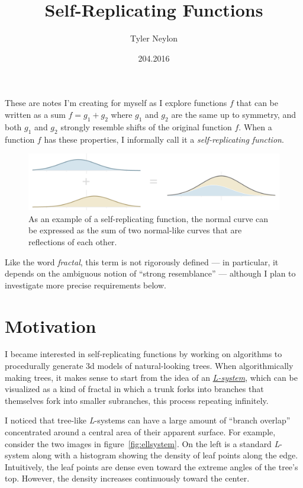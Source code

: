\documentclass[20pt,]{extarticle}
\title{Self-Replicating Functions}
\author{Tyler Neylon}
\date{204.2016}
\newcommand{\class}[1]{}
\newcommand{\optquad}{\quad}
\begin{document}
\maketitle

\newcommand{\R}{\mathbb{R}}
\newcommand{\eqnset}[1]{\left.\mbox{$#1$}\;\;\right\rbrace\class{postbrace}{ }}
\providecommand{\optquad}{\class{optquad}{}}

These are notes I'm creating for myself as I explore functions \(f\)
that can be written as a sum \(f = g_1 + g_2\) where \(g_1\) and \(g_2\)
are the same up to symmetry, and both \(g_1\) and \(g_2\) strongly
resemble shifts of the original function \(f\). When a function \(f\)
has these properties, I informally call it a \emph{self-replicating
function}.

\begin{figure}
\centering
\includegraphics{images/added_normals4.png}
\caption{As an example of a self-replicating function, the normal curve
can be expressed as the sum of two normal-like curves that are
reflections of each other.}\label{fig:added_normals}
\end{figure}

Like the word \emph{fractal}, this term is not rigorously defined --- in
particular, it depends on the ambiguous notion of ``strong resemblance''
--- although I plan to investigate more precise requirements below.

\section{Motivation}\label{motivation}

I became interested in self-replicating functions by working on
algorithms to procedurally generate 3d models of natural-looking trees.
When algorithmically making trees, it makes sense to start from the idea
of an \href{https://en.wikipedia.org/wiki/L-system}{\emph{L-system}},
which can be visualized as a kind of fractal in which a trunk forks into
branches that themselves fork into smaller subranches, this process
repeating infinitely.

I noticed that tree-like \emph{L}-systems can have a large amount of
``branch overlap'' concentrated around a central area of their apparent
surface. For example, consider the two images in
figure~\ref{fig:ellsystem}. On the left is a standard \emph{L}-system
along with a histogram showing the density of leaf points along the
edge. Intuitively, the leaf points are dense even toward the extreme
angles of the tree's top. However, the density increases continuously
toward the center.
\end{document}
